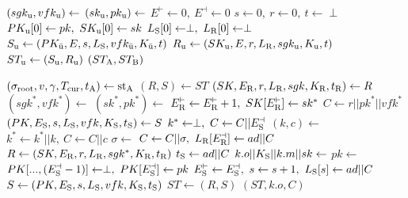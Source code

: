 \algrenewcommand\textproc{}
\algrenewcommand{}

\begin{minipage}{0.5\linewidth}
  {\fontsize{8}{10}\selectfont

  \begin{algorithmic}[1]
    \State $(sgk_\text{u},vfk_\text{u}) \gets$ 
    \State $(sk_\text{u},pk_\text{u}) \gets$ 
    \State $E^\vdash \gets 0, \ E^\dashv \gets 0$
    \State $s \gets 0, \ r \gets 0, \ t \gets \perp$
    \State $PK_\text{u}[0] \gets pk, \ SK_\text{u}[0] \gets sk$
    \State $L_\t{S}[0] \gets \perp, \ L_\t{R}[0] \gets \perp$
    \State $S_\text{u} \gets (PK_{\bar{\text{u}}},E,s,L_\text{S},
                          vfk_{\bar{\text{u}}},K_{\bar{\text{u}}},t)$
    \State $R_\text{u} \gets (SK_\text{u},E,r,L_\text{R},sgk_\text{u},K_\text{u},t)$
    \State $ST_\text{u} \gets (S_\text{u},R_\text{u})$
    \EndFor
    \State \Return $(ST_\text{A},ST_\text{B})$
    \EndProcedure
    
    \item[]
    
    \State $(\sigma_\text{root},v,\gamma,T_\text{cur},t_\text{A}) \gets \text{st}_\text{A}$
    \State $(R,S) \gets ST$
    \State $(SK,E_\text{R},r,L_\text{R},sgk,K_\text{R},t_\text{R}) \gets R$
    \State $(sgk^*,vfk^*) \gets$ 
    \State $(sk^*,pk^*) \gets$ 
    \State $E_\t{R}^\vdash \gets E_\t{R}^\vdash+1, \ SK[E_\t{R}^\vdash] \gets sk^*$
    \State $C \gets r || pk^* || vfk^*$
    \State $(PK,E_\text{S},s,L_\text{S},vfk,K_\text{S},t_\text{S}) \gets S$
    \State $k^* \gets \perp, \ C \gets C || E_\text{S}^\dashv$
    \State $(k,c) \gets$ 
    \State $k^* \gets k^* || k, \ C \gets C || c$ 
    \EndFor
    \State $\sigma \gets$ 
    \State $C \gets C || \sigma, \ L_\t{R}[E_\t{R}^\dashv] \gets ad||C$
    \State $R \gets (SK,E_\text{R},r,L_\text{R},sgk^*,K_\text{R},t_\text{R})$
    \State $t_\text{S} \gets ad||C$
    \State $k.o || K_\text{S} || k.m || sk \gets$ 
    \State $pk \gets$ 
    \State $PK[...,(E_\t{S}^\dashv -1)] \gets \perp, \ PK[E_\t{S}^\dashv] \gets pk$
    \State $E_\text{S}^\vdash \gets E_\text{S}^\dashv, \ s \gets s+1, \ L_\text{S}[s] \gets ad||C$
    \State $S \gets (PK,E_\text{S},s,L_\text{S},vfk,K_\text{S},t_\text{S})$
    \State $ST \gets (R,S)$
    \State \Return $(ST,k.o,C)$
    \EndProcedure
  \end{algorithmic}
  }
\end{minipage}
